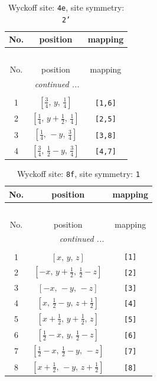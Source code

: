 \documentclass[fleqn,8pt]{jsarticle}
\begin{document}
\renewcommand{\arraystretch}{1.2}
\begin{longtable}{ccc}
\caption{Wyckoff site: {\tt 4e}, site symmetry: {\tt 2'}}
 \\
 \hline \hline
No. & position & mapping \\ \hline \endfirsthead

\multicolumn{2}{l}{\tablename\ \thetable{}} \\
 \hline \hline
No. & position & mapping \\ \hline \endhead

 \hline \hline
\multicolumn{2}{r}{\footnotesize\it continued ...} \\ \endfoot

 \hline \hline
\multicolumn{2}{r}{} \\ \endlastfoot

1 & $\left[ \frac{3}{4},\, y,\, \frac{1}{4} \right]$ & {\tt [1,6]} \\ \hline
2 & $\left[ \frac{1}{4},\, y + \frac{1}{2},\, \frac{1}{4} \right]$ & {\tt [2,5]} \\ \hline
3 & $\left[ \frac{1}{4},\, - y,\, \frac{3}{4} \right]$ & {\tt [3,8]} \\ \hline
4 & $\left[ \frac{3}{4},\, \frac{1}{2} - y,\, \frac{3}{4} \right]$ & {\tt [4,7]} \\
\end{longtable}
\renewcommand{\arraystretch}{1.2}
\begin{longtable}{ccc}
\caption{Wyckoff site: {\tt 8f}, site symmetry: {\tt 1}}
 \\
 \hline \hline
No. & position & mapping \\ \hline \endfirsthead

\multicolumn{2}{l}{\tablename\ \thetable{}} \\
 \hline \hline
No. & position & mapping \\ \hline \endhead

 \hline \hline
\multicolumn{2}{r}{\footnotesize\it continued ...} \\ \endfoot

 \hline \hline
\multicolumn{2}{r}{} \\ \endlastfoot

1 & $\left[ x,\, y,\, z \right]$ & {\tt [1]} \\ \hline
2 & $\left[ - x,\, y + \frac{1}{2},\, \frac{1}{2} - z \right]$ & {\tt [2]} \\ \hline
3 & $\left[ - x,\, - y,\, - z \right]$ & {\tt [3]} \\ \hline
4 & $\left[ x,\, \frac{1}{2} - y,\, z + \frac{1}{2} \right]$ & {\tt [4]} \\ \hline
5 & $\left[ x + \frac{1}{2},\, y + \frac{1}{2},\, z \right]$ & {\tt [5]} \\ \hline
6 & $\left[ \frac{1}{2} - x,\, y,\, \frac{1}{2} - z \right]$ & {\tt [6]} \\ \hline
7 & $\left[ \frac{1}{2} - x,\, \frac{1}{2} - y,\, - z \right]$ & {\tt [7]} \\ \hline
8 & $\left[ x + \frac{1}{2},\, - y,\, z + \frac{1}{2} \right]$ & {\tt [8]} \\
\end{longtable}
\end{document}
